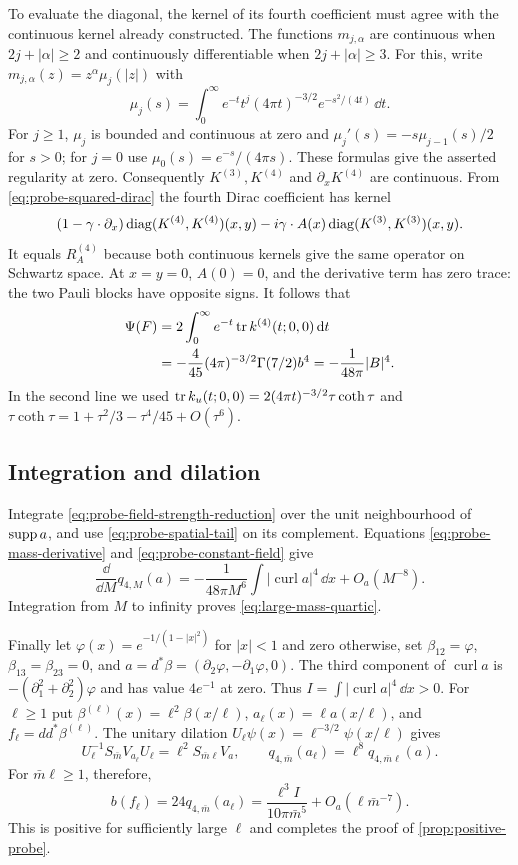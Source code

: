 To evaluate the diagonal, the kernel of its fourth coefficient must
agree with the continuous kernel already constructed. The functions
$m_{j,\alpha}$ are continuous when $2j+|\alpha|\ge2$ and continuously
differentiable when $2j+|\alpha|\ge3$. For this, write
$m_{j,\alpha}(z)=z^\alpha\mu_j(|z|)$ with
\[
 \mu_j(s)=\int_0^\infty e^{-t}t^j(4\pi t)^{-3/2}e^{-s^2/(4t)}\,\dd t.
\]
For $j\ge1$, $\mu_j$ is bounded and continuous at zero and
$\mu_j'(s)=-s\mu_{j-1}(s)/2$ for $s>0$; for $j=0$ use
$\mu_0(s)=e^{-s}/(4\pi s)$. These formulas give the asserted
regularity at zero. Consequently $K^{(3)},K^{(4)}$ and
$\partial_xK^{(4)}$ are continuous. From
\eqref{eq:probe-squared-dirac} the fourth Dirac coefficient has kernel
\[
 (1-\gamma\cdot\partial_x)\operatorname{diag}(K^{(4)},K^{(4)})(x,y)
       -i\gamma\cdot A(x)\operatorname{diag}(K^{(3)},K^{(3)})(x,y).
\]
It equals $R_A^{(4)}$ because both continuous kernels give the same
operator on Schwartz space. At $x=y=0$, $A(0)=0$, and the derivative
term has zero trace: the two Pauli blocks have opposite signs.
It follows that
\begin{align}
 \Psi(F)&=2\int_0^\infty e^{-t}\operatorname{tr} k^{(4)}(t;0,0)\,\mathrm d t\\
 &=-\frac4{45}(4\pi)^{-3/2}\Gamma(7/2)b^4
   =-\frac1{48\pi}|B|^4.\label{eq:probe-constant-field}
\end{align}
In the second line we used
$\operatorname{tr} k_u(t;0,0)=2(4\pi t)^{-3/2}\tau\coth\tau$ and
$\tau\coth\tau=1+\tau^2/3-\tau^4/45+O(\tau^6)$.

\subsection{Integration and dilation}

Integrate \eqref{eq:probe-field-strength-reduction} over the unit
neighbourhood of $\operatorname{supp} a$, and use \eqref{eq:probe-spatial-tail}
on its complement. Equations \eqref{eq:probe-mass-derivative} and
\eqref{eq:probe-constant-field} give
\[
 \frac{\dd}{\dd M}q_{4,M}(a)
 =-\frac1{48\pi M^6}\int|\operatorname{curl}a|^4\,\dd x
                                    +O_a(M^{-8}).
\]
Integration from $M$ to infinity proves
\eqref{eq:large-mass-quartic}.

Finally let $\varphi(x)=e^{-1/(1-|x|^2)}$ for $|x|<1$ and zero
otherwise, set $\beta_{12}=\varphi$, $\beta_{13}=\beta_{23}=0$, and
$a=d^*\beta=(\partial_2\varphi,-\partial_1\varphi,0)$.
The third component of $\operatorname{curl}a$ is
$-(\partial_1^2+\partial_2^2)\varphi$ and has value $4e^{-1}$ at zero.
Thus $I=\int|\operatorname{curl}a|^4\,\dd x>0$.
For $\ell\ge1$ put
$\beta^{(\ell)}(x)=\ell^2\beta(x/\ell)$,
$a_\ell(x)=\ell a(x/\ell)$, and $f_\ell=dd^*\beta^{(\ell)}$.
The unitary dilation $U_\ell\psi(x)=\ell^{-3/2}\psi(x/\ell)$ gives
\[
 U_\ell^{-1}S_{\bar m}V_{a_\ell}U_\ell
       =\ell^2S_{\bar m\ell}V_a,
 \qquad q_{4,\bar m}(a_\ell)=\ell^8q_{4,\bar m\ell}(a).
\]
For $\bar m\ell\ge1$, therefore,
\begin{equation}\label{eq:probe-positive-dilation}
 b(f_\ell)=24q_{4,\bar m}(a_\ell)
   =\frac{\ell^3I}{10\pi\bar m^5}
                      +O_a(\ell\bar m^{-7}).
\end{equation}
This is positive for sufficiently large $\ell$ and completes the proof
of \cref{prop:positive-probe}.


